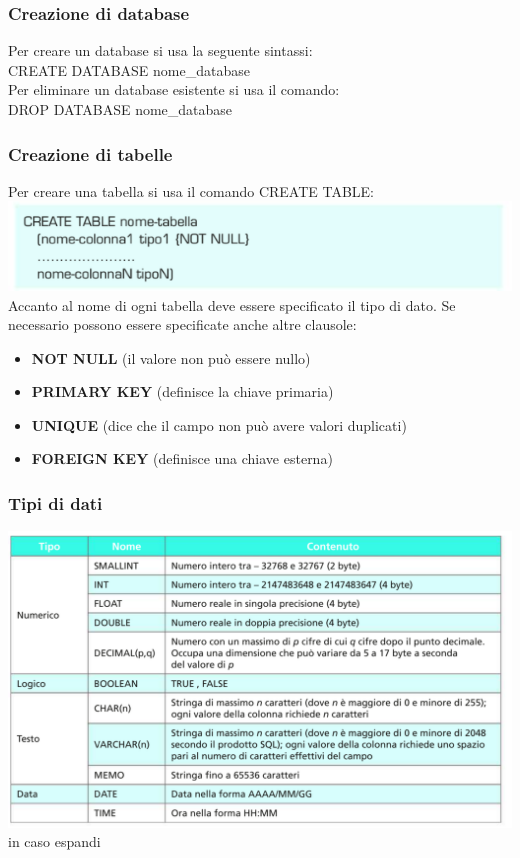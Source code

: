 \documentclass{article}
\begin{document}
    \subsubsection{Creazione di database}
    Per creare un database si usa la seguente sintassi:\\
    CREATE DATABASE nome\_database\\
    Per eliminare un database esistente si usa il comando:\\
    DROP DATABASE nome\_database
    \subsubsection{Creazione di tabelle}
    Per creare una tabella si usa il comando CREATE TABLE:\\
    \includegraphics[]{TAB.PNG}\\
    Accanto al nome di ogni tabella deve essere specificato il tipo di dato.
    Se necessario possono essere specificate anche altre clausole:
    \begin{itemize}
        \item \textbf{NOT NULL} (il valore non può essere nullo)
        \item \textbf{PRIMARY KEY} (definisce la chiave primaria)
        \item \textbf{UNIQUE} (dice che il campo non può avere valori duplicati)
        \item \textbf{FOREIGN KEY} (definisce una chiave esterna)
    \end{itemize}
    \subsubsection{Tipi di dati}
    \includegraphics[scale=0.7]{dati.PNG}
    in caso espandi
    
\end{document}
